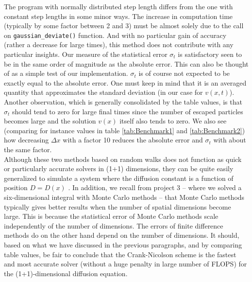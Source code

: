 \documentclass[a4paper, 11pt, notitlepage,english]{article}
\begin{document}
The program with normally distributed step length differs from the one with constant step lengths in some minor ways. The increase in computation time (typically by some factor between 2 and 3) must be almost solely due to the call on \texttt{gaussian\_deviate()} function. And with no particular gain of accuracy (rather a decrease for large times), this method does not contribute with any particular insights. Our measure of the statistical error $\sigma_t$ is satisfactory seen to be in the same order of magnitude as the absolute error. This can also be thought of as a simple test of our implementation. $\sigma_t$ is of course not expected to be exactly equal to the absolute error. One must keep in mind that it is an averaged quantity that approximates the standard deviation (in our case for $v(x,t)$). Another observation, which is generally consolidated by the table values, is that $\sigma_t$ should tend to zero for large final times since the number of escaped particles becomes large and the solution $v(x)$ itself also tends to zero. We also see (comparing for instance values in table \ref{tab:Benchmark1} and \ref{tab:Benchmark2}) how decreasing $\Delta x$ with a factor 10 reduces the absolute error and $\sigma_t$ with about the same factor. \\

Although these two methods based on random walks does not function as quick or particularly accurate solvers in (1+1) dimensions, they can be quite easily generalized to simulate a system where the diffusion constant is a function of position $D = D(x)$ \cite{Farnell}. In addition, we recall from project 3 – where we solved a six-dimensional integral with Monte Carlo methods – that Monte Carlo methods typically gives better results when the number of spatial dimensions become large. This is because the statistical error of Monte Carlo methods scale independently of the number of dimensions. The errors of finite difference methods do on the other hand depend on the number of dimensions. It should, based on what we have discussed in the previous paragraphs, and by comparing table values, be fair to conclude that the Crank-Nicolson scheme is the fastest and most accurate solver (without a huge penalty in large number of FLOPS) for the (1+1)-dimensional diffusion equation.
\end{document}
